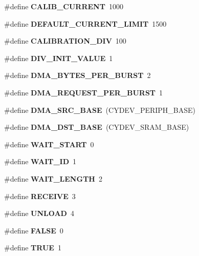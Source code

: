 \begin{DoxyCompactItemize}
\#define {\bfseries C\+A\+L\+I\+B\+\_\+\+C\+U\+R\+R\+E\+NT}~1000
\item 
\mbox{\label{globals_8h_ae0001cc59fb1ba0290c6ef8c2c5692d7}} 
\#define {\bfseries D\+E\+F\+A\+U\+L\+T\+\_\+\+C\+U\+R\+R\+E\+N\+T\+\_\+\+L\+I\+M\+IT}~1500
\item 
\mbox{\label{globals_8h_a80db2dce057c92400a7fb1678bc0b0a8}} 
\#define {\bfseries C\+A\+L\+I\+B\+R\+A\+T\+I\+O\+N\+\_\+\+D\+IV}~100
\item 
\mbox{\label{globals_8h_a14df76a41da04070ee775565e8d67e81}} 
\#define {\bfseries D\+I\+V\+\_\+\+I\+N\+I\+T\+\_\+\+V\+A\+L\+UE}~1
\item 
\mbox{\label{globals_8h_abf6c9afec04b86961e177e0646401ace}} 
\#define {\bfseries D\+M\+A\+\_\+\+B\+Y\+T\+E\+S\+\_\+\+P\+E\+R\+\_\+\+B\+U\+R\+ST}~2
\item 
\mbox{\label{globals_8h_ab4613f8bee68bc68fa6fe94a3ae6d568}} 
\#define {\bfseries D\+M\+A\+\_\+\+R\+E\+Q\+U\+E\+S\+T\+\_\+\+P\+E\+R\+\_\+\+B\+U\+R\+ST}~1
\item 
\mbox{\label{globals_8h_a3cc2eedb40809a1f15ad841c8abbcebf}} 
\#define {\bfseries D\+M\+A\+\_\+\+S\+R\+C\+\_\+\+B\+A\+SE}~(C\+Y\+D\+E\+V\+\_\+\+P\+E\+R\+I\+P\+H\+\_\+\+B\+A\+SE)
\item 
\mbox{\label{globals_8h_aa54e301f446a66cbf8c943d920c8e967}} 
\#define {\bfseries D\+M\+A\+\_\+\+D\+S\+T\+\_\+\+B\+A\+SE}~(C\+Y\+D\+E\+V\+\_\+\+S\+R\+A\+M\+\_\+\+B\+A\+SE)
\item 
\mbox{\label{globals_8h_aea55597952638136c7c929b238904c82}} 
\#define {\bfseries W\+A\+I\+T\+\_\+\+S\+T\+A\+RT}~0
\item 
\mbox{\label{globals_8h_a6a6a0bb02e515a094c3e7ea1bcb66fcc}} 
\#define {\bfseries W\+A\+I\+T\+\_\+\+ID}~1
\item 
\mbox{\label{globals_8h_a235d2d0eac7e9af190ebafb84df37fd9}} 
\#define {\bfseries W\+A\+I\+T\+\_\+\+L\+E\+N\+G\+TH}~2
\item 
\mbox{\label{globals_8h_a3b4d8a5e259fa47a909adefcda3bfb80}} 
\#define {\bfseries R\+E\+C\+E\+I\+VE}~3
\item 
\mbox{\label{globals_8h_abf4aedd34d31b63b63061c975d872580}} 
\#define {\bfseries U\+N\+L\+O\+AD}~4
\item 
\mbox{\label{globals_8h_aa93f0eb578d23995850d61f7d61c55c1}} 
\#define {\bfseries F\+A\+L\+SE}~0
\item 
\mbox{\label{globals_8h_aa8cecfc5c5c054d2875c03e77b7be15d}} 
\#define {\bfseries T\+R\+UE}~1
\item 
\mbox{\label{globals_8h_a0f5a7e2ead9cd507bf8fc9a6f785f012}} 

\end{DoxyCompactItemize}
